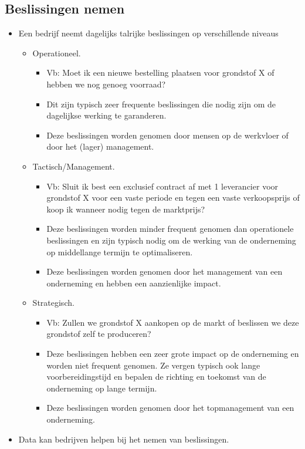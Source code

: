 \documentclass[]{memoir}
\providecommand{\tightlist}{%
  \setlength{\itemsep}{0pt}\setlength{\parskip}{0pt}}
\begin{document}
\subsection*{Beslissingen nemen}\label{beslissingen-nemen}

\begin{itemize}
\tightlist
\item
  Een bedrijf neemt dagelijks talrijke beslissingen op verschillende
  niveaus

  \begin{itemize}
  \tightlist
  \item
    Operationeel.

    \begin{itemize}
    \tightlist
    \item
      Vb: Moet ik een nieuwe bestelling plaatsen voor grondstof X of
      hebben we nog genoeg voorraad?
    \item
      Dit zijn typisch zeer frequente beslissingen die nodig zijn om de
      dagelijkse werking te garanderen.
    \item
      Deze beslissingen worden genomen door mensen op de werkvloer of
      door het (lager) management.
    \end{itemize}
  \item
    Tactisch/Management.

    \begin{itemize}
    \tightlist
    \item
      Vb: Sluit ik best een exclusief contract af met 1 leverancier voor
      grondstof X voor een vaste periode en tegen een vaste
      verkoopsprijs of koop ik wanneer nodig tegen de marktprijs?
    \item
      Deze beslissingen worden minder frequent genomen dan operationele
      beslissingen en zijn typisch nodig om de werking van de
      onderneming op middellange termijn te optimaliseren.
    \item
      Deze beslissingen worden genomen door het management van een
      onderneming en hebben een aanzienlijke impact.
    \end{itemize}
  \item
    Strategisch.

    \begin{itemize}
    \tightlist
    \item
      Vb: Zullen we grondstof X aankopen op de markt of beslissen we
      deze grondstof zelf te produceren?
    \item
      Deze beslissingen hebben een zeer grote impact op de onderneming
      en worden niet frequent genomen. Ze vergen typisch ook lange
      voorbereidingstijd en bepalen de richting en toekomst van de
      onderneming op lange termijn.
    \item
      Deze beslissingen worden genomen door het topmanagement van een
      onderneming.
    \end{itemize}
  \end{itemize}
\item
  Data kan bedrijven helpen bij het nemen van beslissingen.


\end{itemize}
\end{document}
